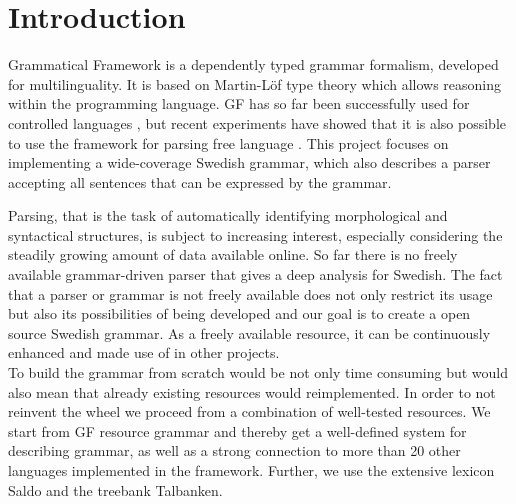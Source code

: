 \documentclass{report}
\begin{document}
\tableofcontents
\newpage
\chapter{Introduction}
Grammatical Framework \cite{gfbok} is a dependently typed grammar formalism,
developed for multilinguality. It is based on Martin-Löf type theory which allows
reasoning within the programming language.
GF has so far been successfully used for 
controlled languages \cite{cnl}, but recent experiments have showed
that it is also possible to use the framework for parsing free language \cite{patent}.
This project focuses on implementing a wide-coverage Swedish grammar, which also
describes a parser accepting all sentences that can be expressed by the grammar.

Parsing, that is the task of automatically identifying morphological and
syntactical structures, is subject to increasing interest, especially
considering the steadily growing amount of data available online. 
So far there is no freely available grammar-driven parser that gives a deep
analysis for Swedish. The fact that %
a parser or grammar is not freely available does not only restrict its
usage but also its possibilities of being developed and our
goal is
to create a open source Swedish grammar. %
As a freely available resource, it can be continuously enhanced and
made use of in other projects.\\
To build the grammar from scratch would be not only time consuming but
would also mean that already existing resources would reimplemented.
In order to not reinvent the wheel we proceed from a combination of well-tested
resources.
We start from GF resource grammar and thereby get
a well-defined system for describing grammar, as well as a strong connection to
more than 20 other languages implemented in the framework. Further, we use
the extensive lexicon Saldo and the treebank Talbanken.
\end{document}
